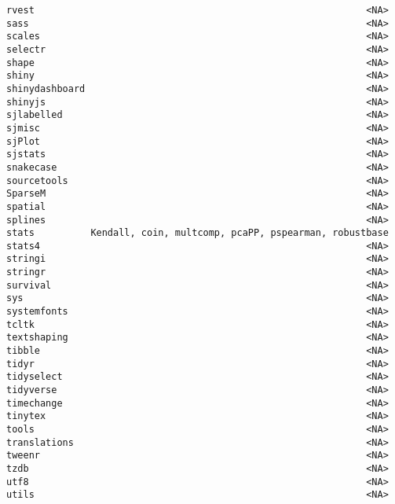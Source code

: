 \documentclass[
  letterpaper,
  DIV=11,
  numbers=noendperiod]{scrreprt}
\begin{document}
\begin{verbatim}
rvest                                                           <NA>
sass                                                            <NA>
scales                                                          <NA>
selectr                                                         <NA>
shape                                                           <NA>
shiny                                                           <NA>
shinydashboard                                                  <NA>
shinyjs                                                         <NA>
sjlabelled                                                      <NA>
sjmisc                                                          <NA>
sjPlot                                                          <NA>
sjstats                                                         <NA>
snakecase                                                       <NA>
sourcetools                                                     <NA>
SparseM                                                         <NA>
spatial                                                         <NA>
splines                                                         <NA>
stats          Kendall, coin, multcomp, pcaPP, pspearman, robustbase
stats4                                                          <NA>
stringi                                                         <NA>
stringr                                                         <NA>
survival                                                        <NA>
sys                                                             <NA>
systemfonts                                                     <NA>
tcltk                                                           <NA>
textshaping                                                     <NA>
tibble                                                          <NA>
tidyr                                                           <NA>
tidyselect                                                      <NA>
tidyverse                                                       <NA>
timechange                                                      <NA>
tinytex                                                         <NA>
tools                                                           <NA>
translations                                                    <NA>
tweenr                                                          <NA>
tzdb                                                            <NA>
utf8                                                            <NA>
utils                                                           <NA>

\end{verbatim}
\end{document}
